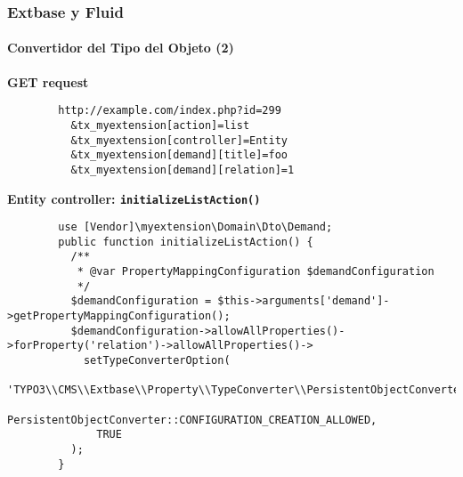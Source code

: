 
\begin{frame}[fragile]
	\frametitle{Extbase y Fluid}
	\framesubtitle{Convertidor del Tipo del Objeto (2)}

	\lstset{
		basicstyle=\tiny\ttfamily
	}

	\smaller\textbf{GET request}\normalsize
	\begin{lstlisting}
		http://example.com/index.php?id=299
		  &tx_myextension[action]=list
		  &tx_myextension[controller]=Entity
		  &tx_myextension[demand][title]=foo
		  &tx_myextension[demand][relation]=1
	\end{lstlisting}

	\smaller\textbf{Entity controller: \texttt{initializeListAction()}}\normalsize
	\begin{lstlisting}
		use [Vendor]\myextension\Domain\Dto\Demand;
		public function initializeListAction() {
		  /**
		   * @var PropertyMappingConfiguration $demandConfiguration
		   */
		  $demandConfiguration = $this->arguments['demand']->getPropertyMappingConfiguration();
		  $demandConfiguration->allowAllProperties()->forProperty('relation')->allowAllProperties()->
		    setTypeConverterOption(
		      'TYPO3\\CMS\\Extbase\\Property\\TypeConverter\\PersistentObjectConverter',
		      PersistentObjectConverter::CONFIGURATION_CREATION_ALLOWED,
		      TRUE
		  );
		}
	\end{lstlisting}

\end{frame}


